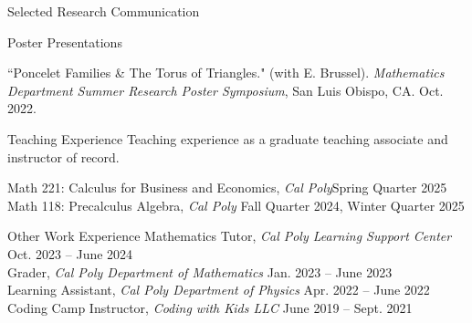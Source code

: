 \documentclass[
	11pt, %
]{cv} %
\begin{document}
\begin{rSection}{Selected Research Communication}
\begin{rSubsectionNumbered}{Poster Presentations}


		\item ``Poncelet Families \& The Torus of Triangles." (with E. Brussel). \textit{ Mathematics Department Summer Research Poster Symposium}, San Luis Obispo, CA. Oct. 2022.
	\end{rSubsectionNumbered}

	
\end{rSection}

\begin{rSection}{Teaching Experience}
	Teaching experience as a graduate teaching associate and instructor of record.

	Math 221: Calculus for Business and Economics, \textit{Cal Poly}\dotfill Spring Quarter 2025 \\
	Math 118: Precalculus Algebra, \textit{Cal Poly} \dotfill Fall Quarter 2024, Winter Quarter 2025
\end{rSection}

\begin{rSection}{Other Work Experience}
	Mathematics Tutor, \textit{Cal Poly Learning Support Center} \dotfill Oct. 2023 -- June 2024 \\
	Grader, \textit{Cal Poly Department of Mathematics} \dotfill Jan. 2023 -- June 2023 \\
	Learning Assistant, \textit{Cal Poly Department of Physics} \dotfill Apr. 2022 -- June 2022 \\
	Coding Camp Instructor, \textit{Coding with Kids LLC} \dotfill June 2019 -- Sept. 2021
\end{rSection}
\end{document}
